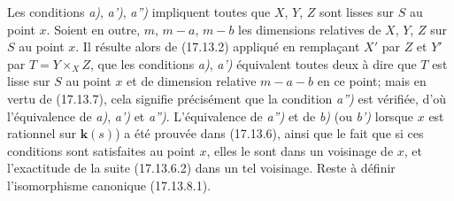 Les conditions \emph{a)}, \emph{a')}, \emph{a'')} impliquent toutes que $X$, $Y$, $Z$ sont lisses sur $S$ au point $x$. Soient en outre, $m$, $m-a$, $m-b$ les dimensions relatives de $X$, $Y$, $Z$ sur $S$ au point $x$. Il résulte alors de (17.13.2) appliqué en remplaçant $X'$ par $Z$ et $Y'$ par $T=Y\times_XZ$, que les conditions \emph{a)}, \emph{a')} équivalent toutes deux à dire que $T$ est lisse sur $S$ au point $x$ et de dimension relative $m-a-b$ en ce point; mais en vertu de (17.13.7), cela signifie précisément que la condition \emph{a'')} est vérifiée, d'où l'équivalence de \emph{a)}, \emph{a')} et \emph{a'')}. L'équivalence de \emph{a'')} et de \emph{b)} (ou \emph{b')} lorsque $x$ est rationnel sur $\boldsymbol{k}(s)$) a été prouvée dans (17.13.6), ainsi que le fait que si ces conditions sont satisfaites au point $x$, elles le sont dans un voisinage de $x$, et l'exactitude de la suite (17.13.6.2) dans un tel voisinage. Reste à définir l'isomorphisme canonique (17.13.8.1).


